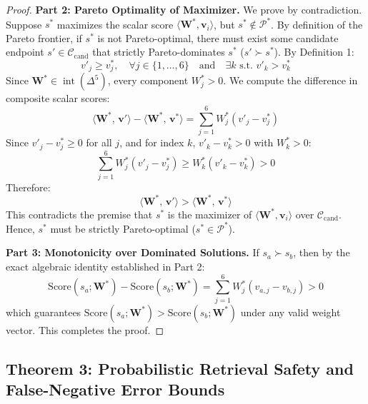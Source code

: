 \begin{proof}
\textbf{Part 2: Pareto Optimality of Maximizer.}
We prove by contradiction. Suppose $s^*$ maximizes the scalar score $\langle \mathbf{W}^*, \mathbf{v}_i \rangle$, but $s^* \notin \mathcal{P}^*$. By definition of the Pareto frontier, if $s^*$ is not Pareto-optimal, there must exist some candidate endpoint $s' \in \mathcal{C}_{\text{cand}}$ that strictly Pareto-dominates $s^*$ ($s' \succ s^*$).
By Definition 1:
\begin{equation}
    v'_{j} \ge v^*_{j}, \quad \forall j \in \{1, \dots, 6\} \quad \text{and} \quad \exists k \text{ s.t. } v'_{k} > v^*_{k}
\end{equation}
Since $\mathbf{W}^* \in \operatorname{int}(\Delta^5)$, every component $W_j^* > 0$. We compute the difference in composite scalar scores:
\begin{equation}
    \langle \mathbf{W}^*, \, \mathbf{v}' \rangle - \langle \mathbf{W}^*, \, \mathbf{v}^* \rangle = \sum_{j=1}^6 W_j^* (v'_{j} - v^*_{j})
\end{equation}
Since $v'_{j} - v^*_{j} \ge 0$ for all $j$, and for index $k$, $v'_{k} - v^*_{k} > 0$ with $W_k^* > 0$:
\begin{equation}
    \sum_{j=1}^6 W_j^* (v'_{j} - v^*_{j}) \ge W_k^* (v'_{k} - v^*_{k}) > 0
\end{equation}
Therefore:
\begin{equation}
    \langle \mathbf{W}^*, \, \mathbf{v}' \rangle > \langle \mathbf{W}^*, \, \mathbf{v}^* \rangle
\end{equation}
This contradicts the premise that $s^*$ is the maximizer of $\langle \mathbf{W}^*, \mathbf{v}_i \rangle$ over $\mathcal{C}_{\text{cand}}$. Hence, $s^*$ must be strictly Pareto-optimal ($s^* \in \mathcal{P}^*$).

\textbf{Part 3: Monotonicity over Dominated Solutions.}
If $s_a \succ s_b$, then by the exact algebraic identity established in Part 2:
\begin{equation}
    \text{Score}(s_a; \mathbf{W}^*) - \text{Score}(s_b; \mathbf{W}^*) = \sum_{j=1}^6 W_j^* (v_{a, j} - v_{b, j}) > 0
\end{equation}
which guarantees $\text{Score}(s_a; \mathbf{W}^*) > \text{Score}(s_b; \mathbf{W}^*)$ under any valid weight vector. This completes the proof.
\end{proof}

\subsection{Theorem 3: Probabilistic Retrieval Safety and False-Negative Error Bounds}
\label{subsec:proof_safety}

